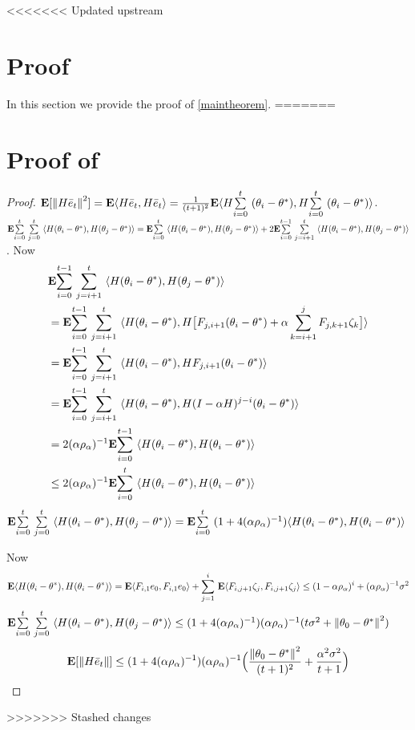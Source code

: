 <<<<<<< Updated upstream
\section{Proof}
\label{sec:proof}
In this section we provide the proof of \cref{maintheorem}.
=======
\section{Proof of }
\begin{proof}
$\E[\norm{H\eb_t}^2]=\E\ip{H\eb_t,H\eb_t}=\frac{1}{(t+1)^2}\E\ip{H\ous{\sum}{i=0}{t}(\theta_i-\ts),H\ous{\sum}{i=0}{t}(\theta_i-\ts)}$.
$\E\ous{\sum}{i=0}{t}\ous{\sum}{j=0}{t}\ip{H(\theta_i-\theta^*),H(\theta_j-\theta^*)}=\E\ous{\sum}{i=0}{t}\ip{H(\theta_i-\theta^*),H(\theta_j-\theta^*)}+ 2\E\ous{\sum}{i=0}{t-1}\ous{\sum}{j=i+1}{t}\ip{H(\theta_i-\theta^*),H(\theta_j-\theta^*)}$. Now
\begin{align}\label{inter}
&\E\ous{\sum}{i=0}{t-1}\ous{\sum}{j=i+1}{t}\ip{H(\theta_i-\theta^*),H(\theta_j-\theta^*)}\nn\\
&=\E\ous{\sum}{i=0}{t-1}\ous{\sum}{j=i+1}{t}\ip{H(\theta_i-\theta^*),H\big[F_{j,i+1} (\theta_i-\theta^*)+\alpha\sum_{k=i+1}^j F_{j,k+1}\zeta_{k}\big]}\nn\\
&=\E\ous{\sum}{i=0}{t-1}\ous{\sum}{j=i+1}{t}\ip{H(\theta_i-\theta^*),H F_{j,i+1} (\theta_i-\theta^*)}\nn\\
&=\E\ous{\sum}{i=0}{t-1}\ous{\sum}{j=i+1}{t}\ip{H(\theta_i-\theta^*),H(I-\alpha H)^{j-i} (\theta_i-\theta^*)}\nn\\
&=2(\alpha\rho_{\alpha})^{-1}\E\ous{\sum}{i=0}{t-1}\ip{H(\theta_i-\theta^*),H (\theta_i-\theta^*)}\nn\\
&\leq2(\alpha\rho_{\alpha})^{-1}\E\ous{\sum}{i=0}{t}\ip{H(\theta_i-\theta^*),H (\theta_i-\theta^*)}\nn\\
\end{align}
$\E\ous{\sum}{i=0}{t}\ous{\sum}{j=0}{t}\ip{H(\theta_i-\theta^*),H(\theta_j-\theta^*)}=\E\ous{\sum}{i=0}{t}(1+4(\alpha\rho_{\alpha})^{-1})\ip{H(\theta_i-\theta^*),H(\theta_i-\theta^*)}$

Now
\begin{align*}
\E\ip{H(\theta_i-\theta^*),H(\theta_i-\theta^*)}=\E\ip{F_{i,1}e_0,F_{i,1}e_0}+\ous{\sum}{j=1}{i}\E\ip{F_{i,j+1}\zeta_j,F_{i,j+1}\zeta_j}
\leq (1-\alpha\rho_{\alpha})^i+ (\alpha\rho_{\alpha})^{-1}\sigma^2
\end{align*}
$\E\ous{\sum}{i=0}{t}\ous{\sum}{j=0}{t}\ip{H(\theta_i-\theta^*),H(\theta_j-\theta^*)}\leq (1+4(\alpha\rho_{\alpha})^{-1}) (\alpha\rho_{\alpha})^{-1}(t\sigma^2+\norm{\theta_0-\ts}^2)$
\begin{align}
\E[\norm{H\eb_t}]\leq (1+4(\alpha\rho_{\alpha})^{-1}) (\alpha\rho_{\alpha})^{-1} \Big(\frac{\norm{\theta_0-\ts}^2}{(t+1)^2}+ \frac{\alpha^2\sigma^2}{t+1} \Big)
\end{align}
\end{proof}

>>>>>>> Stashed changes
